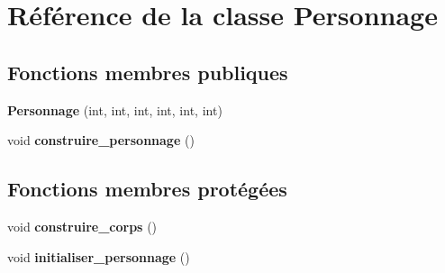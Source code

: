 \hypertarget{classPersonnage}{\section{Référence de la classe Personnage}
\label{classPersonnage}
}
\subsection*{Fonctions membres publiques}
\begin{DoxyCompactItemize}
\item 
\hypertarget{classPersonnage_afba39eec21ceedcf8e5c5db996438b2e}{{\bfseries Personnage} (int, int, int, int, int, int)}\label{classPersonnage_afba39eec21ceedcf8e5c5db996438b2e}

\item 
\hypertarget{classPersonnage_af2b2a8412f4f9b9291b289fbccd00c14}{void {\bfseries construire\-\_\-personnage} ()}\label{classPersonnage_af2b2a8412f4f9b9291b289fbccd00c14}

\end{DoxyCompactItemize}
\subsection*{Fonctions membres protégées}
\begin{DoxyCompactItemize}
\item 
\hypertarget{classPersonnage_a1b33c2388a3bd03f6137f03e91a61bab}{void {\bfseries construire\-\_\-corps} ()}\label{classPersonnage_a1b33c2388a3bd03f6137f03e91a61bab}

\item 
\hypertarget{classPersonnage_a5bc2b2cea92e8f5316bc7268bc6ae391}{void {\bfseries initialiser\-\_\-personnage} ()}\label{classPersonnage_a5bc2b2cea92e8f5316bc7268bc6ae391}

\end{DoxyCompactItemize}
